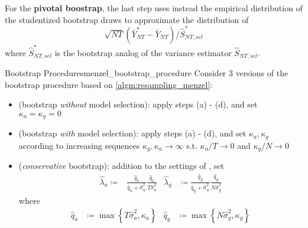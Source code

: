 \documentclass[twoside]{article}
\begin{document}
For the \textbf{pivotal boostrap}, the last step uses instead the empirical distribution of the studentized bootstrap draws to approximate the distribution of $$ \sqrt{NT}\left(\bar{Y}^*_{NT}-\bar{Y}_{NT}\right)/\hat{S}^*_{NT,sel} $$
where $\hat{S}^*_{NT,sel}$ is the bootstrap analog of the variance estimator $\hat{S}_{NT,sel}$.

\begin{definition}{Bootstrap Procedures}{menzel_bootstrap_procedure}
    Consider 3 versions of the bootstrap procedure based on \ref{algm:resampling_menzel}:
    \begin{itemize}
        \item {} (bootstrap \textit{without} model selection): apply steps (a) - (d), and set $\kappa_a = \kappa_g = 0$
        \item {} (bootstrap \textit{with} model selection): apply steps (a) - (d), and set $\kappa_a,\kappa_g$ according to increasing sequences $\kappa_g,\kappa_a\rightarrow \infty$ s.t. $\kappa_a/T\rightarrow 0$ and $\kappa_g/N\rightarrow 0$
        \item {} (\textit{conservative} bootstrap): addition to the settings of , set 
        \begin{align*}
            \hat{\lambda}_a \coloneq& \frac{\hat{q}_a}{\hat{q}_a+\hat{\sigma}^2_w}\frac{\hat{q}_a}{T\hat{\sigma}^2_a} & \hat{\lambda}_g &\coloneq \frac{\hat{q}_g}{\hat{q}_g+\hat{\sigma}^2_w}\frac{\hat{q}_g}{N\hat{\sigma}^2_g}
        \end{align*}
        where 
        \begin{align*}
            \hat{q}_a &\coloneq \max\left\{T\hat{\sigma}^2_a,\kappa_a\right\} & \hat{q}_g &\coloneq \max\left\{N\hat{\sigma}^2_g,\kappa_g\right\}
        \end{align*}
    \end{itemize}
\end{definition}
\end{document}
